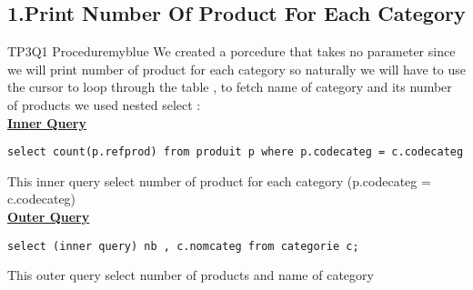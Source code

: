 \subsection*{1.Print Number Of Product For Each Category}


\begin{prettyBox}{TP3Q1 Procedure}{myblue}
We created a porcedure that takes no parameter since we will print number of product for each category so naturally we will have to 
use the cursor to loop through the table , to fetch name of category and its number of products we used nested select :\\[0.15cm]
\textbf{\underline{Inner Query}}
\begin{lstlisting}
select count(p.refprod) from produit p where p.codecateg = c.codecateg 
\end{lstlisting}
This inner query select number of product for each category (p.codecateg = c.codecateg)\\[0.15cm]

\textbf{\underline{Outer Query}}
\begin{lstlisting}
select (inner query) nb , c.nomcateg from categorie c;
\end{lstlisting}
This outer query select number of products and name of category
\end{prettyBox}

\vspace{0.25cm}

